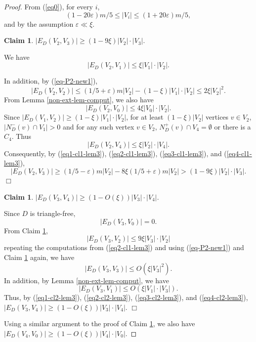 \documentclass{article}
\newtheorem{claim}[theorem]{Claim}
\renewcommand{\epsilon}{{\varepsilon}}
\begin{document}
\begin{proof}
From (\ref{eq0}), for every $i$, $$(1-20\epsilon)m/5\leq |V_i|\leq (1+20\epsilon)m/5,$$
and  by the assumption $\epsilon \ll \xi$.

\begin{claim}\label{cl1-lem3} $|E_D(V_2, V_3)|\geq (1-9\xi)|V_2|\cdot |V_3|.$
\end{claim}
 We have \begin{equation}\label{eq1-cl1-lem3}|E_D(V_2, V_1)|\leq \xi |V_1|\cdot |V_2|.\end{equation} 

In addition, by (\ref{eq-P2-new1}), \begin{equation}\label{eq2-cl1-lem3}|E_D(V_2, V_2)|\leq (1/5+\epsilon)m|V_2| - (1-\xi) |V_1|\cdot |V_2|\leq 2\xi |V_2|^2.\end{equation}
From Lemma \ref{non-ext-lem-comput}, we also have
\begin{equation}\label{eq3-cl1-lem3}
|E_D(V_2, V_0)|\leq 4\xi |V_0|\cdot |V_2|.
\end{equation}
Since $|E_D(V_1, V_2)|\geq (1-\xi)|V_1|\cdot |V_2|$, for at least $(1-\xi) |V_2|$ vertices $v\in V_2$, $|N^-_D(v)\cap V_1|>0$ and for any such vertex $v\in V_2$, $N^+_D(v)\cap V_4=\emptyset$ or there is a $C_4$. Thus
\begin{equation}\label{eq4-cl1-lem3}
|E_D(V_2, V_4)|\leq\xi |V_2|\cdot |V_4|.
\end{equation}
Consequently, by (\ref{eq1-cl1-lem3}), (\ref{eq2-cl1-lem3}), (\ref{eq3-cl1-lem3}), and (\ref{eq4-cl1-lem3}), $$|E_D(V_2, V_3)|\geq (1/5-\epsilon)m|V_2|- 8\xi (1/5+\epsilon)m|V_2| >(1-9\xi)|V_2|\cdot |V_3|.$$
$\Box$

\begin{claim}\label{cl2-lem3} $|E_D(V_3, V_4)|\geq (1-O(\xi))|V_3|\cdot |V_4|.$
\end{claim}
 Since $D$ is triangle-free, \begin{equation}\label{eq1-cl2-lem3}
|E_D(V_3, V_0)|=0.
\end{equation}
From Claim \ref{cl1-lem3},
\begin{equation}\label{eq2-cl2-lem3}
|E_D(V_3, V_2)|\leq 9\xi |V_3|\cdot |V_2|
\end{equation}
repeating the computations from (\ref{eq2-cl1-lem3}) and using (\ref{eq-P2-new1}) and Claim \ref{cl1-lem3} again, we have
\begin{equation}\label{eq3-cl2-lem3}
|E_D(V_3, V_3)|\leq O(\xi |V_3|^2).
\end{equation}
In addition, by Lemma \ref{non-ext-lem-comput}, we have
\begin{equation}\label{eq4-cl2-lem3}
|E_D(V_3, V_1)|\leq O(\xi |V_1|\cdot |V_3|).
\end{equation}
Thus, by (\ref{eq1-cl2-lem3}), (\ref{eq2-cl2-lem3}), (\ref{eq3-cl2-lem3}), and (\ref{eq4-cl2-lem3}), $|E_D(V_3, V_4)|\geq (1-O(\xi))|V_3|\cdot |V_4|$. $\Box$

Using a similar argument to the proof of Claim \ref{cl2-lem3}, we also have $|E_D(V_4, V_0)|\geq (1-O(\xi))|V_4|\cdot |V_0|.$
\end{proof}
\end{document}
